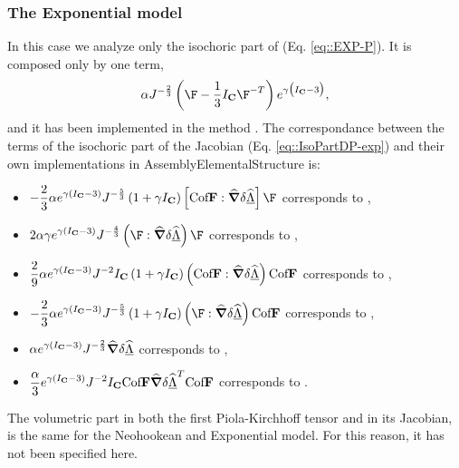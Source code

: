 \subsubsection{The Exponential model} In this case we analyze only the
isochoric part of \Piola (Eq. \eqref{eq::EXP-P}). It is composed only
by one term,
\begin{displaymath} \displaystyle \alpha
J^{-\frac{2}{3}}\left(\F-\frac{1}{3}I_{\C}\F^{-T}\right)e^{\gamma\big(I_{\C}-3\big)},
\end{displaymath} and it has been implemented in the method
.  The correspondance between the terms of the
isochoric part of the Jacobian (Eq. \eqref{eq::IsoPartDP-exp}) and
their own implementations in AssemblyElementalStructure is:
\begin{itemize}
  \item $\displaystyle -\frac{2}{3}\alpha\term
J^{-\frac{5}{3}}\left(1+\gamma
I_{\C}\right)\left[\cofF:\GradSpost\right]\F$ corresponds to
,
  \item $\displaystyle 2\alpha\gamma\term J
^{-\frac{4}{3}}\left(\F:\GradSpost\right)\F$ corresponds to
,
  \item $\displaystyle \frac{2}{9}\alpha e^{\gamma\left(I_{\textbf{C}}-3\right)}
J^{-2}I_{\textbf{C}}\left(1+\gamma
I_{\textbf{C}}\right)\left(\text{Cof}\textbf{F}:\widehat{\boldsymbol{\nabla}}\delta\widehat{\underline{\Lambda}}\right)\text{Cof}\textbf{F}$ corresponds to
,
  \item $\displaystyle -\frac{2}{3}\alpha\term
J^{-\frac{5}{3}}\left(1+\gamma
I_{\C}\right)\left(\F:\GradSpost\right)\cofF$ corresponds to
,
  \item $\displaystyle \alpha e^{\gamma\left(I_{\textbf{C}}-3\right)} J^{-\frac{2}{3}}\widehat{\boldsymbol{\nabla}}\delta\widehat{\underline{\Lambda}}$
corresponds to ,
  \item $\displaystyle \frac{\alpha}{3}e^{\gamma\left(I_{\textbf{C}}-3\right)}
J^{-2}I_{\textbf{C}}\text{Cof}\textbf{F}\widehat{\boldsymbol{\nabla}}\delta\widehat{\underline{\Lambda}}^T\text{Cof}\textbf{F}$ corresponds to
.
\end{itemize} The volumetric part in both the first Piola-Kirchhoff
tensor and in its Jacobian, is the same for the Neohookean and
Exponential model. For this reason, it has not been specified here.
